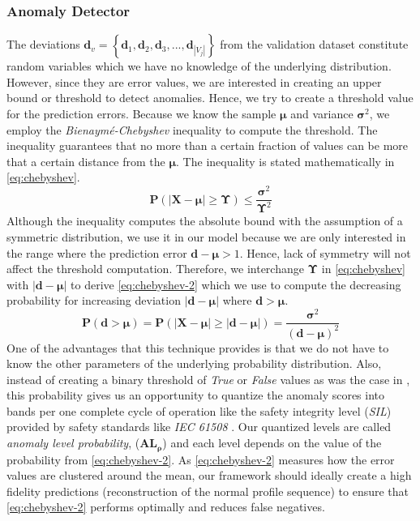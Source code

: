 \subsubsection{Anomaly Detector}
\label{subsec:anomaly-detector}
The deviations ${ \bm{d}_v = \left\lbrace \bm{d}_1, \bm{d}_2, 
\bm{d}_3,...,\bm{d}_{|V_j|} \right\rbrace  }$ from the 
validation dataset 
constitute random variables which we have no knowledge of the 
underlying 
distribution. However, since they are error values, we are 
interested in 
creating an upper bound or threshold to detect anomalies. 
Hence, we 
try to create a threshold value for the prediction errors. 
Because we know the 
sample $\bm{\mu}$ and variance $\bm{\sigma}^2$,  we employ 
the \emph{Bienaymé-Chebyshev} inequality to compute the 
threshold. The 
inequality guarantees that no more than a certain fraction of 
values can be 
more that a certain distance from the $ \bm{\mu} $. The 
inequality is stated 
mathematically in \eqref{eq:chebyshev}.
\begin{equation}
\label{eq:chebyshev}
\bm{P}\left(|\bm{X-\mu}| \geq \bm{\Upsilon} \right) \leq 
\frac{\bm{\sigma}^2}{\bm{\Upsilon}^2}
\end{equation}
Although the inequality computes the absolute bound with the 
assumption of a 
symmetric distribution, we use it in our model because we are 
only 
interested in the range where the prediction error $ \bm{d} - 
\bm{\mu} > 1 $. 
Hence, lack of symmetry will not affect the threshold 
computation. Therefore, 
we interchange $ \bm{\Upsilon} $ in \eqref{eq:chebyshev} with 
$ 
|\bm{d-\mu}|$ to derive \eqref{eq:chebyshev-2} which we 
use to compute the 
decreasing probability for increasing deviation $ 
|\bm{d-\mu}| $ where $ 
\bm{d > \mu} $.
\begin{equation}
\label{eq:chebyshev-2}
\bm{P}\left(\bm{d} > \bm{\mu}\right) = 
\bm{P}\left(|\bm{X-\mu}| \geq 
|\bm{d-\mu}| \right) = 
\frac{\bm{\sigma}^2}{(\bm{d-\mu})^2}
\end{equation}
One of the advantages that this technique provides is that we 
do not have to 
know the other parameters of the underlying probability 
distribution. Also, 
instead of creating a binary threshold of \emph{True} or 
\emph{False} values as 
was the case in \cite{ezeme2019dream}, 
this probability gives us an opportunity to quantize the 
anomaly scores into 
bands per one complete cycle of operation like the safety 
integrity level 
(\textit{SIL}) provided by safety 
standards like 
\textit{IEC 61508} \cite{bell2006introduction}. Our quantized 
levels are called 
\emph{anomaly level probability}, ($\bm{AL_{\rho}}$) and each 
level depends on 
the 
value of the probability from \eqref{eq:chebyshev-2}. As 
\eqref{eq:chebyshev-2} 
measures how the error values are clustered around the mean, 
our framework 
should ideally create a high fidelity predictions 
(reconstruction of the normal 
profile sequence) to ensure that \eqref{eq:chebyshev-2} 
performs optimally and 
reduces false negatives.
